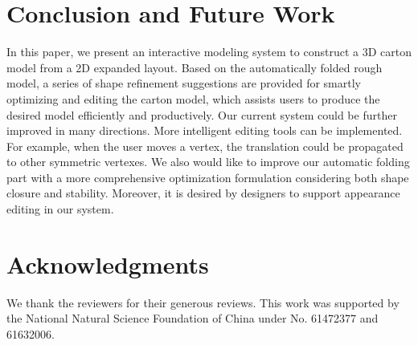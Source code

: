 \documentclass{gmp2018}
\begin{document}









\section{Conclusion and Future Work}\label{sec:conclusion}
In this paper, we present an interactive modeling system to construct a 3D carton model from a 2D expanded layout. 
Based on the automatically folded rough model, a series of shape refinement suggestions are provided for smartly optimizing and editing the carton model, which assists users to produce the desired model efficiently and productively. 
%
Our current system could be further improved in many directions. 
More intelligent editing tools can be implemented. For example, when the user moves a vertex, the translation could be propagated to other symmetric vertexes.
We also would like to improve our automatic folding part with a more comprehensive optimization formulation considering both shape closure and stability. 
%
Moreover, it is desired by designers to support appearance editing in our system.
%

\section*{Acknowledgments} We thank the reviewers for their generous reviews. This work was supported by the National Natural Science Foundation of China under No. 61472377 and 61632006.



\end{document}
